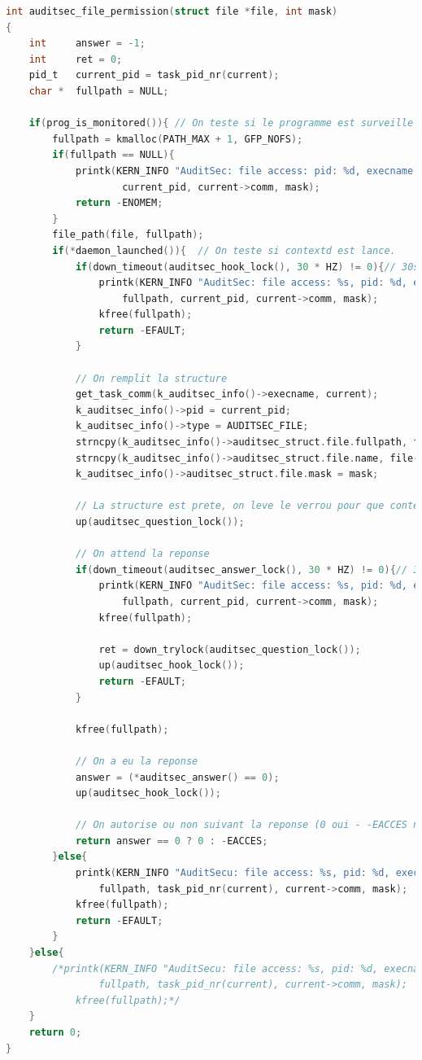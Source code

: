 \documentclass[pdftex,a4paper,titlepage,11pt]{article}
\begin{document}
\begin{lstlisting}[language=C]
int auditsec_file_permission(struct file *file, int mask)
{
	int		answer = -1;
	int		ret = 0;
	pid_t 	current_pid = task_pid_nr(current);
	char *	fullpath = NULL;

	if(prog_is_monitored()){ // On teste si le programme est surveille
		fullpath = kmalloc(PATH_MAX + 1, GFP_NOFS);
		if(fullpath == NULL){
			printk(KERN_INFO "AuditSec: file access: pid: %d, execname: %s, mask: %d NO MEM",
					current_pid, current->comm, mask);
			return -ENOMEM;
		}
		file_path(file, fullpath);
		if(*daemon_launched()){  // On teste si contextd est lance.
			if(down_timeout(auditsec_hook_lock(), 30 * HZ) != 0){// 30s timeout. Is it too much ?
				printk(KERN_INFO "AuditSec: file access: %s, pid: %d, execname: %s, mask: %d HOOK TIMEOUT",
					fullpath, current_pid, current->comm, mask);
				kfree(fullpath);
				return -EFAULT;
			}
			
			// On remplit la structure
			get_task_comm(k_auditsec_info()->execname, current);
			k_auditsec_info()->pid = current_pid;
			k_auditsec_info()->type = AUDITSEC_FILE;
			strncpy(k_auditsec_info()->auditsec_struct.file.fullpath, fullpath, PATH_MAX + 1);
			strncpy(k_auditsec_info()->auditsec_struct.file.name, file->f_path.dentry->d_name.name, NAME_MAX + 1);
			k_auditsec_info()->auditsec_struct.file.mask = mask;
			
			// La structure est prete, on leve le verrou pour que contextd puisse la recuperer
			up(auditsec_question_lock());
			
			// On attend la reponse
			if(down_timeout(auditsec_answer_lock(), 30 * HZ) != 0){// 30s timeout. Is it too much ?
				printk(KERN_INFO "AuditSec: file access: %s, pid: %d, execname: %s, mask: %d ANSWER TIMEOUT",
					fullpath, current_pid, current->comm, mask);
				kfree(fullpath);

				ret = down_trylock(auditsec_question_lock());
				up(auditsec_hook_lock());
				return -EFAULT;
			}

			kfree(fullpath);
			
			// On a eu la reponse			
			answer = (*auditsec_answer() == 0);
			up(auditsec_hook_lock());

			// On autorise ou non suivant la reponse (0 oui - -EACCES non)
			return answer == 0 ? 0 : -EACCES;
		}else{
			printk(KERN_INFO "AuditSecu: file access: %s, pid: %d, execname: %s, mask: %d REFUSED : daemon not launched",
				fullpath, task_pid_nr(current), current->comm, mask);
			kfree(fullpath);
			return -EFAULT;
		}
	}else{
		/*printk(KERN_INFO "AuditSecu: file access: %s, pid: %d, execname: %s, mask: %d",
				fullpath, task_pid_nr(current), current->comm, mask);
			kfree(fullpath);*/
	}
	return 0;
}
\end{lstlisting}
\end{document}
